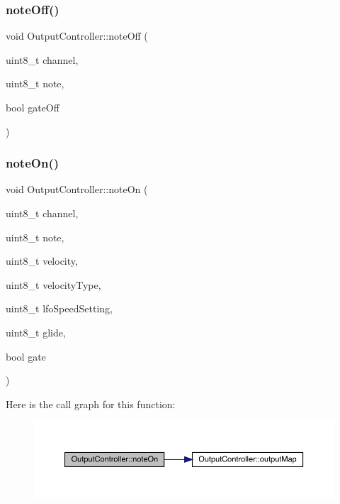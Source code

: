 \subsubsection{\texorpdfstring{note\+Off()}{noteOff()}}
{\footnotesize\ttfamily void Output\+Controller\+::note\+Off (\begin{DoxyParamCaption}\item[{uint8\+\_\+t}]{channel,  }\item[{uint8\+\_\+t}]{note,  }\item[{bool}]{gate\+Off }\end{DoxyParamCaption})}

\mbox{\label{class_output_controller_aa841a26dfccb827a5d9896ea6a57d4ff}} 
\subsubsection{\texorpdfstring{note\+On()}{noteOn()}}
{\footnotesize\ttfamily void Output\+Controller\+::note\+On (\begin{DoxyParamCaption}\item[{uint8\+\_\+t}]{channel,  }\item[{uint8\+\_\+t}]{note,  }\item[{uint8\+\_\+t}]{velocity,  }\item[{uint8\+\_\+t}]{velocity\+Type,  }\item[{uint8\+\_\+t}]{lfo\+Speed\+Setting,  }\item[{uint8\+\_\+t}]{glide,  }\item[{bool}]{gate }\end{DoxyParamCaption})}

Here is the call graph for this function\+:
\nopagebreak
\begin{figure}[H]
\begin{center}
\leavevmode
\includegraphics[width=350pt]{class_output_controller_aa841a26dfccb827a5d9896ea6a57d4ff_cgraph}
\end{center}
\end{figure}
\mbox{\label{class_output_controller_af87eb8cce270ad31c3875208e36f9bc6}} 
